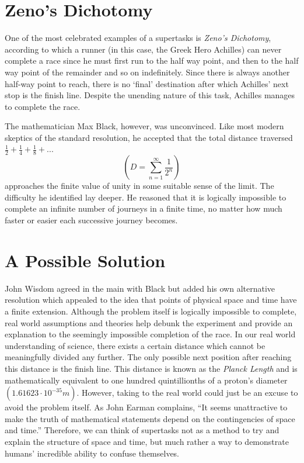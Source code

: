 \documentclass{article}
\begin{document}
\section{Zeno's Dichotomy}
One of the most celebrated examples of a supertasks is \textsl{Zeno’s Dichotomy}, according to which a runner (in this case, the Greek Hero Achilles) can never complete a race since he must first run to the half way point, and then to the half way point of the remainder and so on indefinitely. Since there is always another half-way point to reach, there is no ‘final’ destination after which Achilles’ next stop is the finish line. Despite the unending nature of this task, Achilles manages to complete the race. \cite{Earman-Norton} 

\vspace{3mm}

The mathematician Max Black, however, was unconvinced. Like most modern skeptics of the standard resolution, he accepted that the total distance traversed $\frac{1}{2} + \frac{1}{4} + \frac{1}{8} + $... $$\left( D = \sum_{n=1}^{\infty} \frac{1}{2^{n}} \right)$$ approaches the finite value of unity in some suitable sense of the limit. The difficulty he identified lay deeper. He reasoned that it is logically impossible to complete an infinite number of journeys in a finite time, no matter how much faster or easier each successive journey becomes. \cite{Earman-Norton}

\section{A Possible Solution}
John Wisdom agreed in the main with Black but added his own alternative resolution which appealed to the idea that points of physical space and time have a finite extension.\cite{Earman-Norton} Although the problem itself is logically impossible to complete, real world assumptions and theories help debunk the experiment and provide an explanation to the seemingly impossible completion of the race. In our real world understanding of science, there exists a certain distance which cannot be meaningfully divided any further. The only possible next position after reaching this distance is the finish line. This distance is known as the \textsl{Planck Length} and is mathematically equivalent to one hundred quintillionths of a proton’s diameter $\left( 1.61623 \cdot 10^{-35} m \right)$. However, taking to the real world could just be an excuse to avoid the problem itself. As John Earman complains, “It seems unattractive to make the truth of mathematical statements depend on the contingencies of space and time.” Therefore, we can think of supertasks not as a method to try and explain the structure of space and time, but much rather a way to demonstrate humans' incredible ability to confuse themselves.
\end{document}
